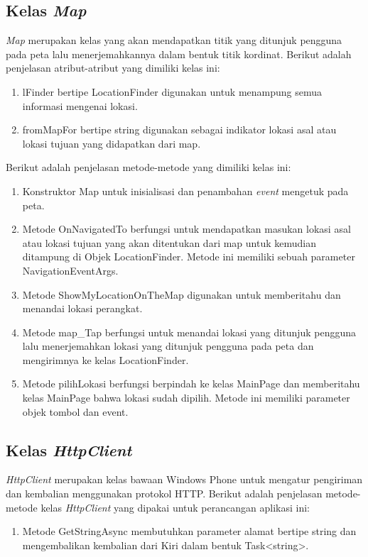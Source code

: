\subsection{Kelas \textit{Map}}
\label{lab:Kelas Map}
\hspace{0.5cm} \textit{Map} merupakan kelas yang akan mendapatkan titik yang ditunjuk pengguna pada peta lalu menerjemahkannya dalam bentuk titik kordinat. Berikut adalah penjelasan atribut-atribut yang dimiliki kelas ini:
\begin{enumerate}
	\item lFinder bertipe LocationFinder digunakan untuk menampung semua informasi mengenai lokasi.
	\item fromMapFor bertipe string digunakan sebagai indikator lokasi asal atau lokasi tujuan yang didapatkan dari map.
\end{enumerate}

Berikut adalah penjelasan metode-metode yang dimiliki kelas ini:
\begin{enumerate}
	\item Konstruktor Map untuk inisialisasi dan penambahan \textit{event} mengetuk pada peta.
	\item Metode OnNavigatedTo berfungsi untuk mendapatkan masukan lokasi asal atau lokasi tujuan yang akan ditentukan dari map untuk kemudian ditampung di Objek LocationFinder. Metode ini memiliki sebuah parameter NavigationEventArgs.
	\item Metode ShowMyLocationOnTheMap digunakan untuk memberitahu dan menandai lokasi perangkat.
	\item Metode map\_Tap berfungsi untuk menandai lokasi yang ditunjuk pengguna lalu  menerjemahkan lokasi yang ditunjuk pengguna pada peta dan mengirimnya ke kelas LocationFinder.
	\item Metode pilihLokasi berfungsi berpindah ke kelas MainPage dan memberitahu kelas MainPage bahwa lokasi sudah dipilih. Metode ini memiliki parameter objek tombol dan event.
\end{enumerate}

\subsection{Kelas \textit{HttpClient}}
\label{lab:Kelas HttpClient}
\hspace{0.5cm} \textit{HttpClient} merupakan kelas bawaan Windows Phone untuk mengatur pengiriman dan kembalian menggunakan protokol HTTP. Berikut adalah penjelasan metode-metode kelas \textit{HttpClient} yang dipakai untuk perancangan aplikasi ini:
\begin{enumerate}
	\item Metode GetStringAsync membutuhkan parameter alamat bertipe string dan mengembalikan kembalian dari Kiri dalam bentuk Task<string>.
\end{enumerate}

